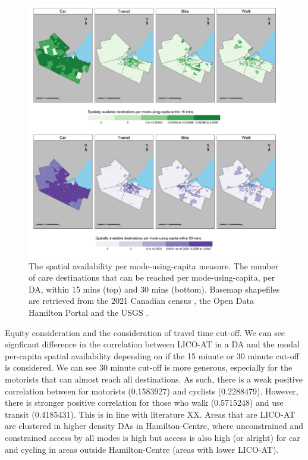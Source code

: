 \documentclass[
  super,
  preprint,
  3p]{elsarticle}
\begin{document}
\begin{figure}

{\centering \includegraphics[width=6.25in,height=\textheight]{figures/Fig7-plot_Savail_smallv_measures.png}

}

\caption{\label{fig-Fig7}The spatial availability per mode-using-capita
measure. The number of care destinations that can be reached per
mode-using-capita, per DA, within 15 mins (top) and 30 mins (bottom).
Basemap shapefiles are retrieved from the 2021 Canadian census
\citep{governmentofcanadaCensusPopulation2023}, the Open Data Hamilton
Portal \citep{opendatahamiltonCityBoundary2023} and the USGS
\citep{greatlakesUSGS2010}.}

\end{figure}

Equity consideration and the consideration of travel time cut-off. We
can see signficant difference in the correlation between LICO-AT in a DA
and the modal per-capita spatial availability depending on if the 15
minute or 30 minute cut-off is considered. We can see 30 minute cut-off
is more generous, especially for the motorists that can almost reach all
destinations. As such, there is a weak positive correlation between for
motorists (0.1583927) and cyclists (0.2288479). However, there is
stronger positive correlation for those who walk (0.5715248) and use
transit (0.4185431). This is in line with literature XX. Areas that are
LICO-AT are clustered in higher density DAs in Hamilton-Centre, where
unconstrained and constrained access by all modes is high but access is
also high (or alright) for car and cycling in areas outside
Hamilton-Centre (areas with lower LICO-AT).
\end{document}
